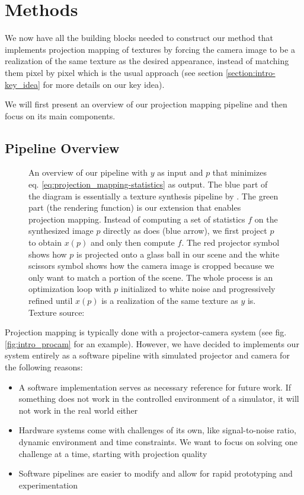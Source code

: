 \chapter{Methods}
\label{chapter:methods}

We now have all the building blocks needed to construct our method that implements projection mapping of textures by forcing the camera image to be a realization of the same texture as the desired appearance, instead of matching them pixel by pixel which is the usual approach (see section \ref{section:intro-key_idea} for more details on our key idea).

We will first present an overview of our projection mapping pipeline and then focus on its main components.

\section{Pipeline Overview}
\label{section:methods-pipeline_overview}

\begin{figure}[]
    \centering
    \def\svgwidth{\textwidth}
    
    \caption{An overview of our pipeline with \(y\) as input and \(p\) that minimizes eq. \ref{eq:projection_mapping-statistics} as output. The blue part of the diagram is essentially a texture synthesis pipeline by \citet{Gatys2015}. The green part (the rendering function) is our extension that enables projection mapping. Instead of computing a set of statistics \(f\) on the synthesized image \(p\) directly as \citet{Gatys2015} does (blue arrow), we first project \(p\) to obtain \(x(p)\) and only then compute \(f\). The red projector symbol shows how \(p\) is projected onto a glass ball in our scene and the white scissors symbol shows how the camera image is cropped because we only want to match a portion of the scene. The whole process is an optimization loop with \(p\) initialized to white noise and progressively refined until \(x(p)\) is a realization of the same texture as \(y\) is. Texture source: \citet{Pixar128}}
    \label{fig:methods_pipeline}
\end{figure}

Projection mapping is typically done with a projector-camera system (see fig. \ref{fig:intro_procam} for an example). However, we have decided to implements our system entirely as a software pipeline with simulated projector and camera for the following reasons:

\begin{itemize}
    \item A software implementation serves as necessary reference for future work. If something does not work in the controlled environment of a simulator, it will not work in the real world either
    \item Hardware systems come with challenges of its own, like signal-to-noise ratio, dynamic environment and time constraints. We want to focus on solving one challenge at a time, starting with projection quality
    \item Software pipelines are easier to modify and allow for rapid prototyping and experimentation
\end{itemize}

